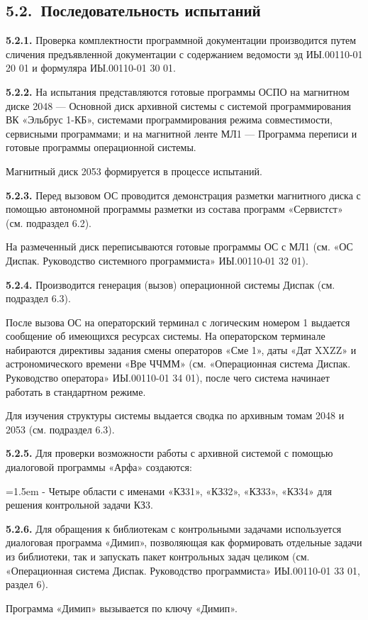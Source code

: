 \documentclass[11pt,a4paper]{article}
\begin{document}
\subsection*{5.2.~Последовательность испытаний}
\par\textbf{5.2.1.} Проверка комплектности программной документации производится путем сличения предъявленной документации с содержанием ведомости эд ИЫ.00110-01 20 01 и формуляра ИЫ.00110-01 30 01.\par
\par\textbf{5.2.2.} На испытания представляются готовые программы ОСПО на магнитном диске 2048 --- Основной диск архивной системы с системой программирования ВК «Эльбрус 1-КБ», системами программирования режима совместимости, сервисными программами; и на магнитной ленте МЛ1 --- Программа переписи и готовые программы операционной системы.\par
Магнитный диск 2053 формируется в процессе испытаний.

\par\textbf{5.2.3.} Перед вызовом ОС проводится демонстрация разметки магнитного диска с помощью автономной программы разметки из состава программ «Сервистст» (см. подраздел 6.2).\par
На размеченный диск переписываются готовые программы ОС с МЛ1 (см. «ОС Диспак. Руководство системного программиста» ИЫ.00110-01 32 01).

\par\textbf{5.2.4.} Производится генерация (вызов) операционной системы Диспак (см. подраздел 6.3).\par
После вызова ОС на операторский терминал с логическим номером 1 выдается сообщение об имеющихся ресурсах системы. На операторском терминале набираются директивы задания смены операторов «Сме 1», даты «Дат XXZZ» и астрономического времени «Вре ЧЧММ» (см. «Операционная система Диспак. Руководство оператора» ИЫ.00110-01 34 01), после чего система начинает работать в стандартном режиме.

Для изучения структуры системы выдается сводка по архивным томам 2048 и 2053 (см. подраздел 6.3).

\par\textbf{5.2.5.} Для проверки возможности работы с архивной системой с помощью диалоговой программы «Арфа» создаются:\par
\par\hangindent=1.5em - Четыре области с именами «КЗ31», «КЗ32», «КЗ33», «КЗ34» для решения контрольной задачи КЗ3.\par
\par\textbf{5.2.6.} Для обращения к библиотекам с контрольными задачами используется диалоговая программа «Димип», позволяющая как формировать отдельные задачи из библиотеки, так и запускать пакет контрольных задач целиком (см. «Операционная система Диспак. Руководство программиста» ИЫ.00110-01 33 01, раздел 6).\par
Программа «Димип» вызывается по ключу «Димип».
\end{document}

